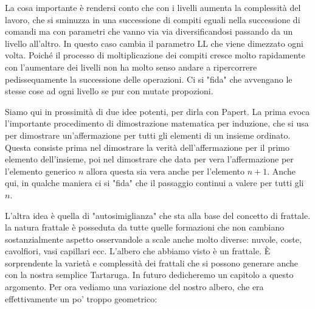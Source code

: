 La cosa importante è rendersi conto che con i livelli aumenta la complessità del lavoro, che si sminuzza in una successione di compiti eguali nella successione di comandi ma con parametri che vanno via via diversificandosi passando da un livello all'altro. In questo caso cambia il parametro LL che viene dimezzato ogni volta. Poiché il processo di moltiplicazione dei compiti cresce molto rapidamente con l'aumentare dei livelli non ha molto senso andare a ripercorrere pedissequamente la successione delle operazioni. Ci si "fida" che avvengano le stesse cose ad ogni livello se pur con mutate propozioni. 

Siamo qui in prossimità di due idee potenti, per dirla con Papert. La prima evoca l'importante procedimento di dimostrazione matematica per induzione, che si usa per dimostrare un'affermazione per tutti gli elementi di un insieme ordinato. Questa consiste prima nel dimostrare la verità dell'affermazione per il primo elemento dell'insieme, poi nel dimostrare che data per vera l'affermazione per l'elemento generico $n$ allora questa sia vera anche per l'elemento $n+1$. Anche qui, in qualche maniera ci si "fida" che il passaggio continui a valere per tutti gli $n$.

L'altra idea è quella di "autosimiglianza" che sta alla base del concetto di frattale. la natura frattale è posseduta da tutte quelle formazioni che non cambiano sostanzialmente aspetto osservandole a scale  anche molto diverse: nuvole, coste, cavolfiori, vasi capillari ecc. L'albero che abbiamo visto è un frattale. È sorprendente la varietà e complessità dei frattali che si possono generare anche con la nostra semplice Tartaruga. In futuro dedicheremo un capitolo a questo argomento. Per ora vediamo una variazione del nostro albero, che era effettivamente un po' troppo geometrico:

\vskip 1cm

